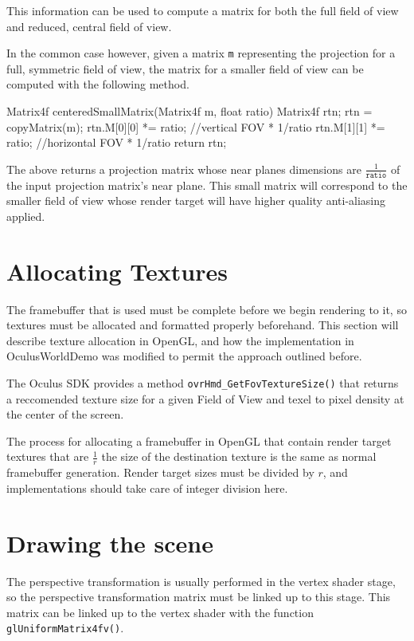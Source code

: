 \documentclass[12pt,a4paper,twoside,openright]{report}
\begin{document}
This information can be used to compute a matrix for both the full field of view and reduced, central field of view.

In the common case however, given a matrix \texttt{m} representing the projection for a full, symmetric field of view, the matrix for a smaller field of view can be computed with the following method.

\begin{blockcode}
Matrix4f centeredSmallMatrix(Matrix4f m, float ratio){
    Matrix4f rtn; 
    rtn = copyMatrix(m);
    rtn.M[0][0] *= ratio; //vertical FOV * 1/ratio
    rtn.M[1][1] *= ratio; //horizontal FOV * 1/ratio
    return rtn;
}
\end{blockcode}

The above returns a projection matrix whose near planes dimensions are $\frac{1}{\texttt{ratio}}$ of the input projection matrix's near plane. This small matrix will correspond to the smaller field of view whose render target will have higher quality anti-aliasing applied. 

\section{Allocating Textures}\label{texturealloc}

The framebuffer that is used must be complete before we begin rendering to it, so textures must be allocated and formatted properly beforehand. This section will describe texture allocation in OpenGL, and how the implementation in OculusWorldDemo was modified to permit the approach outlined before. 
 
The Oculus SDK provides a method \texttt{ovrHmd\_GetFovTextureSize()} that returns a reccomended texture size for a given Field of View and texel to pixel density at the center of the screen.

The process for allocating a framebuffer in OpenGL that contain render target textures that are $\frac{1}{r}$ the size of the destination texture is the same as normal framebuffer generation. Render target sizes must be divided by $r$, and implementations should take care of integer division here.

\section{Drawing the scene}

The perspective transformation is usually performed in the vertex shader stage, so the perspective transformation matrix must be linked up to this stage.
This matrix can be linked up to the vertex shader with the function \texttt{glUniformMatrix4fv()}.\\
\end{document}

